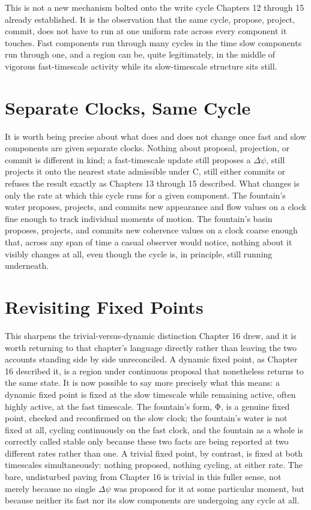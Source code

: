 This is not a new mechanism bolted onto the write cycle Chapters 12 through 15 already established. It is the observation that the same cycle, propose, project, commit, does not have to run at one uniform rate across every component it touches. Fast components run through many cycles in the time slow components run through one, and a region can be, quite legitimately, in the middle of vigorous fast-timescale activity while its slow-timescale structure sits still.

\section{Separate Clocks, Same Cycle}

It is worth being precise about what does and does not change once fast and slow components are given separate clocks. Nothing about proposal, projection, or commit is different in kind; a fast-timescale update still proposes a \(\Delta\psi\), still projects it onto the nearest state admissible under C, still either commits or refuses the result exactly as Chapters 13 through 15 described. What changes is only the rate at which this cycle runs for a given component. The fountain's water proposes, projects, and commits new appearance and flow values on a clock fine enough to track individual moments of motion. The fountain's basin proposes, projects, and commits new coherence values on a clock coarse enough that, across any span of time a casual observer would notice, nothing about it visibly changes at all, even though the cycle is, in principle, still running underneath.

\section{Revisiting Fixed Points}

This sharpens the trivial-versus-dynamic distinction Chapter 16 drew, and it is worth returning to that chapter's language directly rather than leaving the two accounts standing side by side unreconciled. A dynamic fixed point, as Chapter 16 described it, is a region under continuous proposal that nonetheless returns to the same state. It is now possible to say more precisely what this means: a dynamic fixed point is fixed at the slow timescale while remaining active, often highly active, at the fast timescale. The fountain's form, Φ, is a genuine fixed point, checked and reconfirmed on the slow clock; the fountain's water is not fixed at all, cycling continuously on the fast clock, and the fountain as a whole is correctly called stable only because these two facts are being reported at two different rates rather than one. A trivial fixed point, by contrast, is fixed at both timescales simultaneously: nothing proposed, nothing cycling, at either rate. The bare, undisturbed paving from Chapter 16 is trivial in this fuller sense, not merely because no single \(\Delta\psi\) was proposed for it at some particular moment, but because neither its fast nor its slow components are undergoing any cycle at all.

